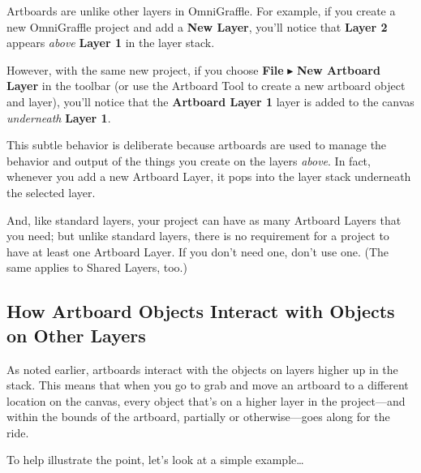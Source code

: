 \documentclass[../main.tex]{subfiles}
\begin{document}

Artboards are unlike other layers in OmniGraffle. For example, if you create a new OmniGraffle
project and add a \textbf{New Layer}, you'll notice that \textbf{Layer 2} appears
\textit{above} \textbf{Layer 1} in the layer stack.


However, with the same new project, if you choose \textbf{File} $\blacktriangleright$
\textbf{New Artboard Layer} in the toolbar (or use the Artboard Tool to create a new artboard
object and layer), you'll notice that the \textbf{Artboard Layer 1} layer is added to the
canvas \textit{underneath} \textbf{Layer 1}.


This subtle behavior is deliberate because artboards are used to manage the behavior and output
of the things you create on the layers \textit{above}. In fact, whenever you add a new
Artboard Layer, it pops into the layer stack underneath the selected layer.

And, like standard layers, your project can have as many Artboard Layers that you need; but
unlike standard layers, there is no requirement for a project to have at least one Artboard
Layer. If you don't need one, don't use one. (The same applies to Shared Layers, too.)

\subsection{How Artboard Objects Interact with Objects on Other Layers}

As noted earlier, artboards interact with the objects on layers higher up in the stack. This
means that when you go to grab and move an artboard to a different location on the canvas,
every object that's on a higher layer in the project---and within the bounds of the artboard,
partially or otherwise---goes along for the ride.

To help illustrate the point, let's look at a simple example\ldots{}
\end{document}
